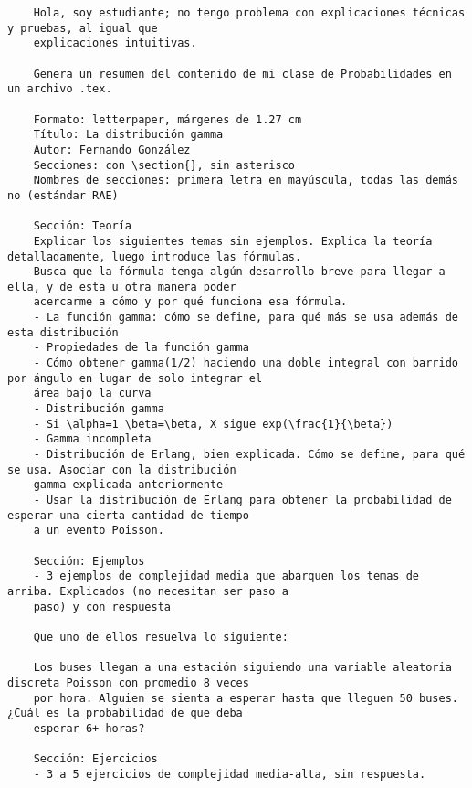 \documentclass[letterpaper]{article}
\begin{document}
\begin{verbatim}
	Hola, soy estudiante; no tengo problema con explicaciones técnicas y pruebas, al igual que 
	explicaciones intuitivas.
	
	Genera un resumen del contenido de mi clase de Probabilidades en un archivo .tex.
	
	Formato: letterpaper, márgenes de 1.27 cm
	Título: La distribución gamma
	Autor: Fernando González
	Secciones: con \section{}, sin asterisco
	Nombres de secciones: primera letra en mayúscula, todas las demás no (estándar RAE)
	
	Sección: Teoría
	Explicar los siguientes temas sin ejemplos. Explica la teoría detalladamente, luego introduce las fórmulas.
	Busca que la fórmula tenga algún desarrollo breve para llegar a ella, y de esta u otra manera poder
	acercarme a cómo y por qué funciona esa fórmula.
	- La función gamma: cómo se define, para qué más se usa además de esta distribución
	- Propiedades de la función gamma
	- Cómo obtener gamma(1/2) haciendo una doble integral con barrido por ángulo en lugar de solo integrar el
	área bajo la curva
	- Distribución gamma
	- Si \alpha=1 \beta=\beta, X sigue exp(\frac{1}{\beta})
	- Gamma incompleta
	- Distribución de Erlang, bien explicada. Cómo se define, para qué se usa. Asociar con la distribución
	gamma explicada anteriormente
	- Usar la distribución de Erlang para obtener la probabilidad de esperar una cierta cantidad de tiempo
	a un evento Poisson.
	
	Sección: Ejemplos
	- 3 ejemplos de complejidad media que abarquen los temas de arriba. Explicados (no necesitan ser paso a
	paso) y con respuesta
	
	Que uno de ellos resuelva lo siguiente:
	
	Los buses llegan a una estación siguiendo una variable aleatoria discreta Poisson con promedio 8 veces
	por hora. Alguien se sienta a esperar hasta que lleguen 50 buses. ¿Cuál es la probabilidad de que deba
	esperar 6+ horas?
	
	Sección: Ejercicios
	- 3 a 5 ejercicios de complejidad media-alta, sin respuesta.
\end{verbatim}
\end{document}

